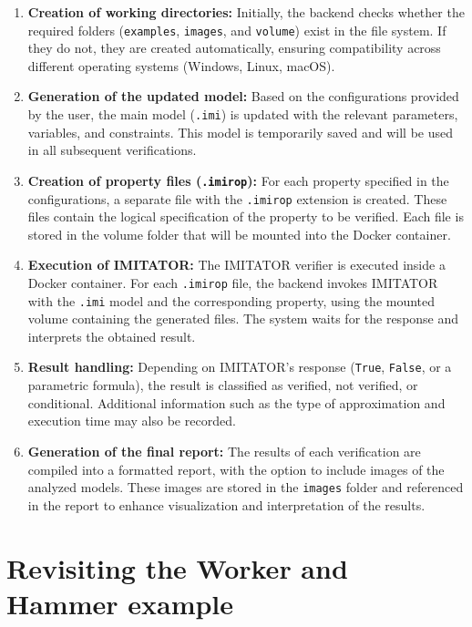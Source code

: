\begin{enumerate}
    \item \textbf{Creation of working directories:} Initially, the backend checks whether the required folders (\texttt{examples}, \texttt{images}, and \texttt{volume}) exist in the file system. If they do not, they are created automatically, ensuring compatibility across different operating systems (Windows, Linux, macOS).

    \item \textbf{Generation of the updated model:} Based on the configurations provided by the user, the main model (\texttt{.imi}) is updated with the relevant parameters, variables, and constraints. This model is temporarily saved and will be used in all subsequent verifications.

    \item \textbf{Creation of property files (\texttt{.imirop}):} For each property specified in the configurations, a separate file with the \texttt{.imirop} extension is created. These files contain the logical specification of the property to be verified. Each file is stored in the volume folder that will be mounted into the Docker container.

    \item \textbf{Execution of IMITATOR:} The IMITATOR verifier is executed inside a Docker container. For each \texttt{.imirop} file, the backend invokes IMITATOR with the \texttt{.imi} model and the corresponding property, using the mounted volume containing the generated files. The system waits for the response and interprets the obtained result.

    \item \textbf{Result handling:} Depending on IMITATOR’s response (\texttt{True}, \texttt{False}, or a parametric formula), the result is classified as verified, not verified, or conditional. Additional information such as the type of approximation and execution time may also be recorded.

    \item \textbf{Generation of the final report:} The results of each verification are compiled into a formatted report, with the option to include images of the analyzed models. These images are stored in the \texttt{images} folder and referenced in the report to enhance visualization and interpretation of the results.
\end{enumerate}



\section{Revisiting the Worker and Hammer example}

